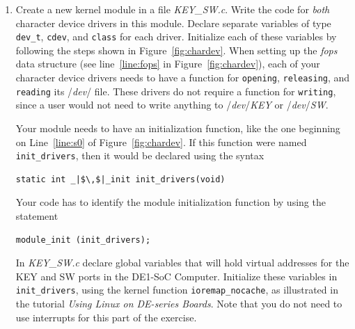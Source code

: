 \documentclass[epsfig,10pt,fullpage]{article}
\begin{document}
\begin{enumerate}
\item Create a new kernel module in a file {\it KEY\_SW.c}. Write the code for {\it both}
character device drivers in this module. Declare separate variables of type \texttt{dev\_t},
\texttt{cdev}, and \texttt{class} for each driver. Initialize each of these variables by
following the steps shown in Figure~\ref{fig:chardev}. When setting up the {\it fops} data
structure (see line~\ref{line:fops} in Figure~\ref{fig:chardev}), each of your character
device drivers needs to have a function for \texttt{opening}, \texttt{releasing}, and
\texttt{reading} its /{\it dev}/ file. These drivers do not require a function for 
\texttt{writing}, since a user would not need to write anything to /{\it dev}/{\it KEY} or
/{\it dev}/{\it SW}.

\noindent
Your module needs to have an initialization function, like the one beginning on Line~\ref{line:s0}
of Figure~\ref{fig:chardev}. If this function were named \texttt{init\_drivers}, then it 
would be declared using the syntax

\begin{lstlisting}
static int _|$\,$|_init init_drivers(void)
\end{lstlisting}

\noindent Your code has to identify the module initialization function by using the statement
\begin{lstlisting}
module_init (init_drivers);
\end{lstlisting}

\noindent
In {\it KEY\_SW.c} declare global variables that will hold virtual addresses for the KEY
and SW ports in the DE1-SoC Computer. Initialize these variables in
\texttt{init\_drivers}, using the kernel function \texttt{ioremap\_nocache}, as
illustrated in the tutorial {\it Using Linux on DE-series Boards}. Note that you do not need to 
use interrupts for this part of the exercise. 


\end{enumerate}
\end{document}
